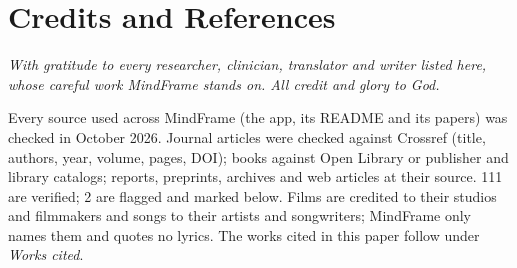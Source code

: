 \documentclass[10pt]{article}
\theoremstyle{remark}
\begin{document}
\section*{Credits and References}
\noindent\emph{With gratitude to every researcher, clinician, translator and writer listed here, whose careful work MindFrame stands on. All credit and glory to God.}

\noindent\small Every source used across MindFrame (the app, its README and its papers) was checked in October 2026. Journal articles were checked against Crossref (title, authors, year, volume, pages, DOI); books against Open Library or publisher and library catalogs; reports, preprints, archives and web articles at their source. 111 are verified; 2 are flagged and marked below. Films are credited to their studios and filmmakers and songs to their artists and songwriters; MindFrame only names them and quotes no lyrics. The works cited in this paper follow under \emph{Works cited}.

\footnotesize
\end{document}
